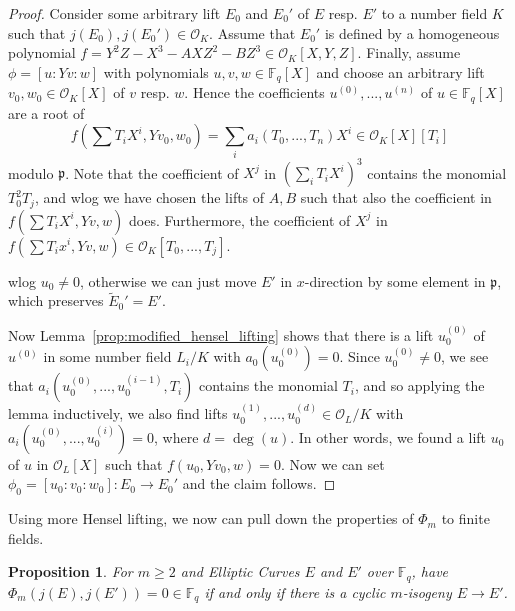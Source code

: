 \documentclass{ociamthesis}
\newcommand{\F}{\mathbb{F}}
\newcommand{\p}{\mathfrak{p}}
\renewcommand{\O}{\mathcal{O}}
\newtheorem{prop}{Proposition}[section]
\theoremstyle{definition}
\begin{document}
\begin{proof}
    Consider some arbitrary lift $E_0$ and $E_0'$ of $E$ resp. $E'$ to a number field $K$ such that $j(E_0), j(E_0') \in \O_K$.
    Assume that $E_0'$ is defined by a homogeneous polynomial $f = Y^2Z - X^3 - AXZ^2 - BZ^3 \in \O_K[X, Y, Z]$.
    Finally, assume $\phi = [u : Y v : w]$ with polynomials $u, v, w \in \F_q[X]$ and choose an arbitrary lift $v_0, w_0 \in \O_K[X]$ of $v$ resp. $w$.
    Hence the coefficients $u^{(0)}, ..., u^{(n)}$ of $u \in \F_q[X]$ are a root of
    \begin{equation*}
        f(\sum T_i X^i, Y v_0, w_0) = \sum_i a_i(T_0, ..., T_n) X^i \in \O_K[X][T_i]
    \end{equation*}
    modulo $\p$.
    Note that the coefficient of $X^j$ in $(\sum_i T_i X^i)^3$ contains the monomial $T_0^2 T_j$, and wlog we have chosen the lifts of $A, B$ such that also the coefficient in $f(\sum T_i X^i, Y v, w)$ does.
    Furthermore, the coefficient of $X^j$ in $f(\sum T_i x^i, Y v, w) \in \O_K[T_0, ..., T_j]$.

    wlog $u_0 \neq 0$, otherwise we can just move $E'$ in $x$-direction by some element in $\p$, which preserves $\tilde{E}_0' = E'$.

    Now Lemma~\ref{prop:modified_hensel_lifting} shows that there is a lift $u^{(0)}_0$ of $u^{(0)}$ in some number field $L_i/K$ with $a_0(u^{(0)}_0) = 0$.
    Since $u_0^{(0)} \neq 0$, we see that $a_i(u_0^{(0)}, ..., u_0^{(i - 1)}, T_i)$ contains the monomial $T_i$, and so applying the lemma inductively, we also find lifts $u^{(1)}_0, ..., u^{(d)}_0 \in \O_L/K$ with $a_i(u^{(0)}_0, ..., u^{(i)}_0) = 0$, where $d = \deg(u)$.
    In other words, we found a lift $u_0$ of $u$ in $\O_L[X]$ such that $f(u_0, Y v_0, w) = 0$.
    Now we can set $\phi_0 = [u_0 : v_0 : w_0]: E_0 \to E_0'$ and the claim follows.
\end{proof}
Using more Hensel lifting, we now can pull down the properties of $\Phi_m$ to finite fields.
\begin{prop}
    For $m \geq 2$ and Elliptic Curves $E$ and $E'$ over $\F_q$, have $\Phi_m(j(E), j(E')) = 0 \in \F_q$ if and only if there is a cyclic $m$-isogeny $E \to E'$.
\end{prop}
\end{document}
